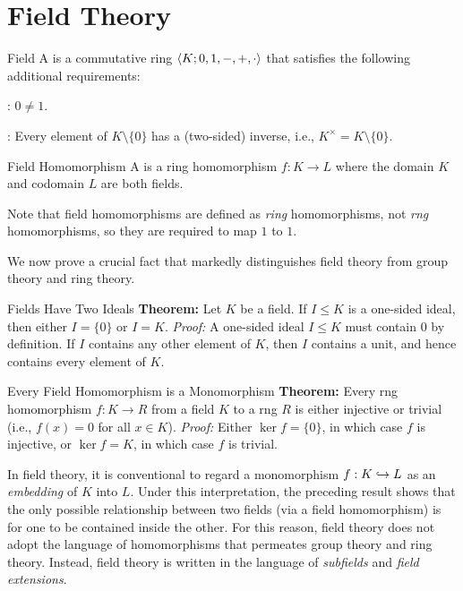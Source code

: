 \documentclass[12pt]{report}
\begin{document}
\chapter{Field Theory}

\begin{dfnbox}{Field}
	A  is a commutative ring ${\langle {K; 0, 1, -, +, \cdot} \rangle}$ that satisfies the following additional requirements:
	\begin{dfnitems}
		\item {}: $0 \ne 1$.
		\item {}: Every element of $K \setminus \{0\}$ has a (two-sided) inverse, i.e., $K^\times = K \setminus \{0\}$.
	\end{dfnitems}
\end{dfnbox}

\begin{dfnbox}{Field Homomorphism}
	A  is a ring homomorphism $f: K \to L$ where the domain $K$ and codomain $L$ are both fields.
\end{dfnbox}

Note that field homomorphisms are defined as \textit{ring} homomorphisms, not \textit{rng} homomorphisms, so they are required to map $1$ to $1$.

We now prove a crucial fact that markedly distinguishes field theory from group theory and ring theory.

\begin{thmbox}{Fields Have Two Ideals}
	\textbf{Theorem:} Let $K$ be a field. If $I \le K$ is a one-sided ideal, then either $I = \{0\}$ or $I = K$.
\tcblower
	\textit{Proof:} A one-sided ideal $I \le K$ must contain $0$ by definition. If $I$ contains any other element of $K$, then $I$ contains a unit, and hence contains every element of $K$.
\end{thmbox}

\begin{thmbox}{Every Field Homomorphism is a Monomorphism}
	\textbf{Theorem:} Every rng homomorphism $f: K \to R$ from a field $K$ to a rng $R$ is either injective or trivial (i.e., $f(x) = 0$ for all $x \in K$).
\tcblower
	\textit{Proof:} Either $\ker f = \{0\}$, in which case $f$ is injective, or $\ker f = K$, in which case $f$ is trivial.
\end{thmbox}

In field theory, it is conventional to regard a monomorphism $f: K \hookrightarrow L$ as an \textit{embedding} of $K$ into $L$. Under this interpretation, the preceding result shows that the only possible relationship between two fields (via a field homomorphism) is for one to be contained inside the other. For this reason, field theory does not adopt the language of homomorphisms that permeates group theory and ring theory. Instead, field theory is written in the language of \textit{subfields} and \textit{field extensions}.
\end{document}
